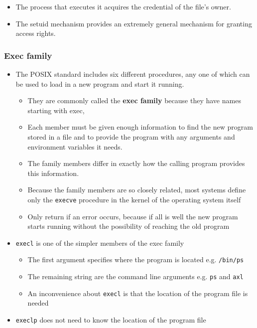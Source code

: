 \documentclass[11pt]{article}
\providecommand{\tightlist}{%
      \setlength{\itemsep}{0pt}\setlength{\parskip}{0pt}}
\begin{document}
\begin{itemize}
  \begin{itemize}
  \tightlist
  \item
    The process that executes it acquires the credential of the file's
    owner.
  \item
    The setuid mechanism provides an extremely general mechanism for
    granting access rights.
  \end{itemize}
\end{itemize}

    \subsubsection{Exec family}\label{exec-family}

\begin{itemize}
\tightlist
\item
  The POSIX standard includes six different procedures, any one of which
  can be used to load in a new program and start it running.

  \begin{itemize}
  \tightlist
  \item
    They are commonly called the \textbf{exec family} because they have
    names starting with exec,
  \item
    Each member must be given enough information to find the new program
    stored in a file and to provide the program with any arguments and
    environment variables it needs.
  \item
    The family members differ in exactly how the calling program
    provides this information.
  \item
    Because the family members are so closely related, most systems
    define only the \texttt{execve} procedure in the kernel of the
    operating system itself
  \item
    Only return if an error occurs, because if all is well the new
    program starts running without the possibility of reaching the old
    program
  \end{itemize}
\item
  \texttt{execl} is one of the simpler members of the exec family

  \begin{itemize}
  \tightlist
  \item
    The first argument specifies where the program is located e.g.
    \texttt{/bin/ps}
  \item
    The remaining string are the command line arguments e.g. \texttt{ps}
    and \texttt{axl}
  \item
    An inconvenience about \texttt{execl} is that the location of the
    program file is needed
  \end{itemize}
\item
  \texttt{execlp} does not need to know the location of the program file


\end{itemize}
\end{document}
